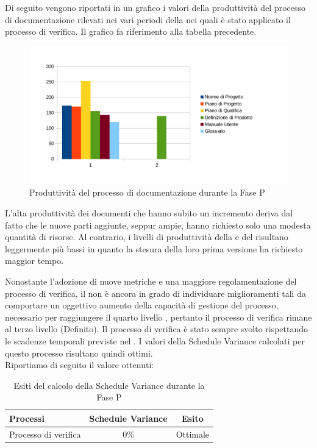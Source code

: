 Di seguito vengono riportati in un grafico i valori della produttività del processo di documentazione rilevati nei vari periodi della  nei quali è stato applicato il processo di verifica. Il grafico fa riferimento alla tabella precedente.\\
\begin{figure}[H]
	\centering
		\includegraphics[width=12cm]{PianoDiQualifica/Pics/ProduttivitaDocumentazioneFaseP.pdf}
	\caption{Produttività del processo di documentazione durante la Fase P}
\end{figure}
L'alta produttività dei documenti che hanno subito un incremento deriva dal fatto che le nuove parti aggiunte, seppur ampie, hanno richiesto solo una modesta quantità di risorse.
Al contrario, i livelli di produttività della  e del  risultano leggermente più bassi in quanto la stesura della loro prima versione ha richiesto maggior tempo.

	Nonostante l'adozione di nuove metriche e una maggiore regolamentazione del processo di verifica, il  non è ancora in grado di individuare miglioramenti tali da comportare un oggettivo aumento della capacità di gestione del processo, necessario per raggiungere il quarto livello , pertanto il processo di verifica rimane al terzo livello (Definito).
	Il processo di verifica è stato sempre svolto rispettando le scadenze temporali previste nel . I valori della Schedule Variance calcolati per questo processo risultano quindi ottimi.\\
			Riportiamo di seguito il valore ottenuti:
			\begin{table}[H]
				\centering
				\begin{tabu}{| l | c | c |}
					\hline
						Processi 							& Schedule Variance	& Esito		\\ \hline \hline
						Processo di verifica & 0\% & Ottimale \\ \hline
				\end{tabu}
				\caption{Esiti del calcolo della Schedule Variance durante la Fase P}
			\end{table}	

